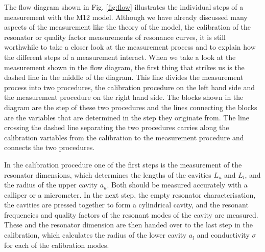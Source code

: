 The flow diagram shown in Fig. \ref{fig:flow} illustrates the individual steps of a measurement with the M12 model. Although we have already discussed many aspects of the measurement like the theory of the model, the calibration of the resonator or quality factor measurements of resonance curves, it is  still worthwhile to take a closer look at the measurement process and to explain how the different steps of a measurement interact. When we take a look at the measurement shown in the flow diagram, the first thing that strikes us is the dashed line in the middle of the diagram.  This line divides the measurement process into two procedures, the calibration procedure on the left hand side and the measurement procedure on the right hand side. The blocks shown in the diagram are the step of these two procedures and the lines connecting the blocks are the variables that are determined in the step they originate from. The line crossing the dashed line separating the two procedures carries along the calibration variables from the calibration to the measurement procedure and connects the two procedures.

In the calibration procedure one of the first steps is the measurement of the resonator dimensions, which determines the lengths of the cavities $L_u$ and $L_l$, and the radius of the upper cavity $a_u$. Both should be measured accurately with a calliper or a micrometer. In the next step, the empty resonator characterisation, the cavities are pressed together to form a cylindrical cavity, and the resonant frequencies and quality factors of the resonant modes of the cavity are measured. These and the resonator dimension are then handed over to the last step in the calibration, which calculates the radius of the lower cavity $a_l$ and conductivity $\sigma$ for each of the calibration modes.

